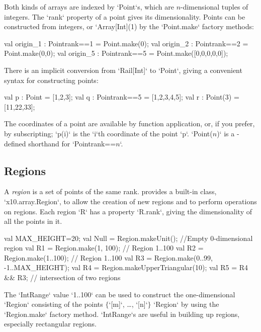 Both kinds of arrays are indexed by \xcd`Point`s, which are $n$-dimensional tuples of
integers.  The \xcd`rank`
property of a point gives its dimensionality.  Points can be constructed from
integers, or \xcd`Array[Int](1) by the \xcd`Point.make` factory methods:
\begin{xten}
val origin_1 : Point{rank==1} = Point.make(0);
val origin_2 : Point{rank==2} = Point.make(0,0);
val origin_5 : Point{rank==5} = Point.make([0,0,0,0,0]);
\end{xten}

There is an implicit conversion from \xcd`Rail[Int]` to 
\xcd`Point`, giving
a convenient syntax for constructing points: 

\begin{xten}
val p : Point = [1,2,3];
val q : Point{rank==5} = [1,2,3,4,5];
val r : Point(3) = [11,22,33];
\end{xten}

The coordinates of a point are available by function application, or, if you
prefer, by subscripting; \xcd`p(i)` is the
\xcd`i`th coordinate of the point \xcd`p`. 
\xcdmath`Point($n$)` is a -defined shorthand  for 
\xcdmath`Point{rank==$n$}`.


\subsection{Regions}\label{XtenRegions}

A {\em region} is a set of points of the same rank.  {}\Xten{}
provides a built-in class, \xcd`x10.array.Region`, to allow the
creation of new regions and to perform operations on regions. 
Each region \xcd`R` has a property \xcd`R.rank`, giving the dimensionality of
all the points in it.

\begin{ex}
\begin{xten}
val MAX_HEIGHT=20;
val Null = Region.makeUnit(); //Empty 0-dimensional region
val R1 = Region.make(1, 100); // Region 1..100
val R2 = Region.make(1..100);  // Region 1..100
val R3 = Region.make(0..99, -1..MAX_HEIGHT);
val R4 = Region.makeUpperTriangular(10);
val R5 = R4 && R3; // intersection of two regions
\end{xten}

The \xcd`IntRange` value \xcd`1..100` can be used to construct
the one-dimensional \xcd`Region` consisting of the points
$\{$\xcdmath`[m]`, \dots, \xcdmath`[n]`$\}$
\xcd`Region` by using the \xcd`Region.make` factory method.  
\xcd`IntRange`s are useful in building up regions, especially rectangular regions.  
\end{ex}

